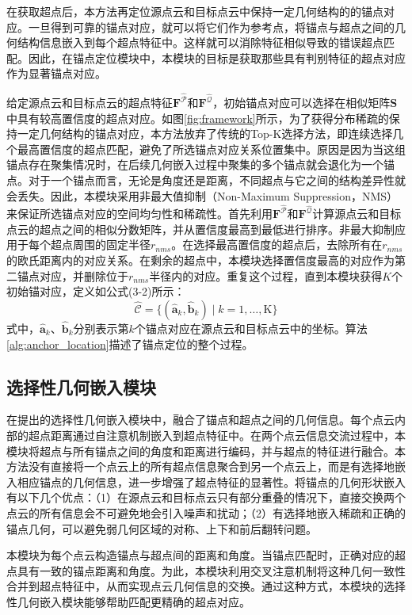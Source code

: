     在获取超点后，本方法再定位源点云和目标点云中保持一定几何结构的的锚点对应。一旦得到可靠的锚点对应，就可以将它们作为参考点，将锚点与超点之间的几何结构信息嵌入到每个超点特征中。这样就可以消除特征相似导致的错误超点匹配。因此，在锚点定位模块中，本模块的目标是获取那些具有判别特征的超点对应作为显著锚点对应。\par

    给定源点云和目标点云的超点特征$\mathbf{F}^{\hat{\mathcal{P}}}$和$\mathbf{F}^{\hat{\mathcal{Q}}}$，初始锚点对应可以选择在相似矩阵$\mathbf{S}$中具有较高置信度的超点对应。如图\ref{fig:framework}所示，为了获得分布稀疏的保持一定几何结构的锚点对应，本方法放弃了传统的Top-K选择方法，即连续选择几个最高置信度的超点匹配，避免了所选锚点对应关系位置集中。原因是因为当这组锚点存在聚集情况时，在后续几何嵌入过程中聚集的多个锚点就会退化为一个锚点。对于一个锚点而言，无论是角度还是距离，不同超点与它之间的结构差异性就会丢失。因此，本模块采用非最大值抑制（Non-Maximum Suppression，NMS）来保证所选锚点对应的空间均匀性和稀疏性。首先利用$\mathbf{F}^{\hat{\mathcal{P}}}$和$\mathbf{F}^{\hat{\mathcal{Q}}}$计算源点云和目标点云的超点之间的相似分数矩阵，并从置信度最高到最低进行排序。非最大抑制应用于每个超点周围的固定半径$r_{nms}$。在选择最高置信度的超点后，去除所有在$r_{nms}$的欧氏距离内的对应关系。在剩余的超点中，本模块选择置信度最高的对应作为第二锚点对应，并删除位于$r_{nms}$半径内的对应。重复这个过程，直到本模块获得$K$个初始锚对应，定义如公式(3-2)所示：
    \begin{equation}
        \hat{\mathcal{C}}=\{(\mathbf{\hat{a}}_k,\mathbf{\hat{b}}_k) \mid k =1,\dots,\mathrm{K}\}
    \end{equation}
    式中，$\mathbf{\hat{a}}_k$、$\mathbf{\hat{b}}_k$分别表示第$k$个锚点对应在源点云和目标点云中的坐标。算法\ref{alg:anchor_location}描述了锚点定位的整个过程。

    \subsection{选择性几何嵌入模块}
    在提出的选择性几何嵌入模块中，融合了锚点和超点之间的几何信息。每个点云内部的超点距离通过自注意机制嵌入到超点特征中。在两个点云信息交流过程中，本模块将超点与所有锚点之间的角度和距离进行编码，并与超点的特征进行融合。本方法没有直接将一个点云上的所有超点信息聚合到另一个点云上，而是有选择地嵌入相应锚点的几何信息，进一步增强了超点特征的显著性。将锚点的几何形状嵌入有以下几个优点：（1）在源点云和目标点云只有部分重叠的情况下，直接交换两个点云的所有信息会不可避免地会引入噪声和扰动；（2）有选择地嵌入稀疏和正确的锚点几何，可以避免弱几何区域的对称、上下和前后翻转问题。\par
    本模块为每个点云构造锚点与超点间的距离和角度。当锚点匹配时，正确对应的超点具有一致的锚点距离和角度。为此，本模块利用交叉注意机制将这种几何一致性合并到超点特征中，从而实现点云几何信息的交换。通过这种方式，本模块的选择性几何嵌入模块能够帮助匹配更精确的超点对应。\par


